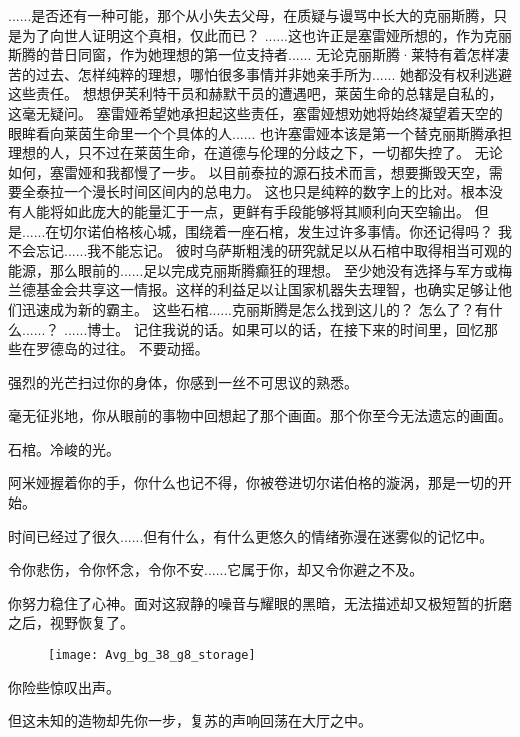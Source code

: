 \documentclass[openany]{book}
\begin{document}
\begin{dialogue}
     ......是否还有一种可能，那个从小失去父母，在质疑与谩骂中长大的克丽斯腾，只是为了向世人证明这个真相，仅此而已？
     ......这也许正是塞雷娅所想的，作为克丽斯腾的昔日同窗，作为她理想的第一位支持者......
     无论克丽斯腾·莱特有着怎样凄苦的过去、怎样纯粹的理想，哪怕很多事情并非她亲手所为......
     她都没有权利逃避这些责任。
     想想伊芙利特干员和赫默干员的遭遇吧，莱茵生命的总辖是自私的，这毫无疑问。
     塞雷娅希望她承担起这些责任，塞雷娅想劝她将始终凝望着天空的眼眸看向莱茵生命里一个个具体的人......
     也许塞雷娅本该是第一个替克丽斯腾承担理想的人，只不过在莱茵生命，在道德与伦理的分歧之下，一切都失控了。
     无论如何，塞雷娅和我都慢了一步。
     以目前泰拉的源石技术而言，想要撕毁天空，需要全泰拉一个漫长时间区间内的总电力。
     这也只是纯粹的数字上的比对。根本没有人能将如此庞大的能量汇于一点，更鲜有手段能够将其顺利向天空输出。
     但是......在切尔诺伯格核心城，围绕着一座石棺，发生过许多事情。你还记得吗？
     我不会忘记......我不能忘记。
     彼时乌萨斯粗浅的研究就足以从石棺中取得相当可观的能源，那么眼前的......足以完成克丽斯腾癫狂的理想。
     至少她没有选择与军方或梅兰德基金会共享这一情报。这样的利益足以让国家机器失去理智，也确实足够让他们迅速成为新的霸主。
     这些石棺......克丽斯腾是怎么找到这儿的？
     怎么了？有什么......？
     ......博士。
     记住我说的话。如果可以的话，在接下来的时间里，回忆那些在罗德岛的过往。
     不要动摇。
\end{dialogue}\par

强烈的光芒扫过你的身体，你感到一丝不可思议的熟悉。\par
毫无征兆地，你从眼前的事物中回想起了那个画面。那个你至今无法遗忘的画面。\par
石棺。冷峻的光。\par
阿米娅握着你的手，你什么也记不得，你被卷进切尔诺伯格的漩涡，那是一切的开始。\par
时间已经过了很久......但有什么，有什么更悠久的情绪弥漫在迷雾似的记忆中。\par
令你悲伤，令你怀念，令你不安......它属于你，却又令你避之不及。\par
你努力稳住了心神。面对这寂静的噪音与耀眼的黑暗，无法描述却又极短暂的折磨之后，视野恢复了。\par
\begin{figure}[h]
    \centering
    \texttt{[image: Avg\_bg\_38\_g8\_storage]}
\end{figure}
你险些惊叹出声。\par
但这未知的造物却先你一步，复苏的声响回荡在大厅之中。
\end{document}
